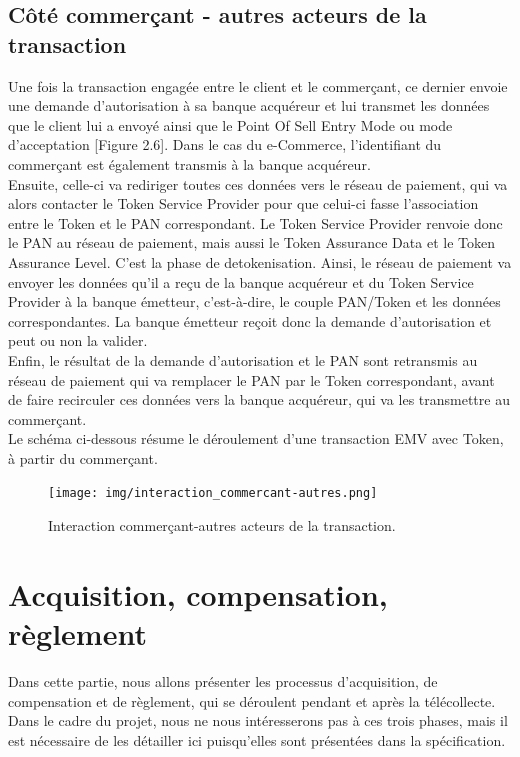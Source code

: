 \documentclass{report}
\begin{document}
\subsection{Côté commerçant - autres acteurs de la transaction}
Une fois la transaction engagée entre le client et le commerçant, ce dernier envoie une demande d'autorisation à sa banque acquéreur et lui transmet les données que le client lui a envoyé ainsi que le Point Of Sell Entry Mode ou mode d'acceptation [Figure 2.6]. Dans le cas du e-Commerce, l'identifiant du commerçant est également transmis à la banque acquéreur.\\
Ensuite, celle-ci va rediriger toutes ces données vers le réseau de paiement, qui va alors contacter le Token Service Provider pour que celui-ci fasse l'association entre le Token et le PAN correspondant. Le Token Service Provider renvoie donc le PAN au réseau de paiement, mais aussi le Token Assurance Data et le Token Assurance Level. C'est la phase de detokenisation. Ainsi, le réseau de paiement va envoyer les données qu'il a reçu de la banque acquéreur et du Token Service Provider à la banque émetteur, c'est-à-dire, le couple PAN/Token et les données correspondantes. La banque émetteur reçoit donc la demande d'autorisation et peut ou non la valider.\\
Enfin, le résultat de la demande d'autorisation et le PAN sont retransmis au réseau de paiement qui va remplacer le PAN par le Token correspondant, avant de faire recirculer ces données vers la banque acquéreur, qui va les transmettre au commerçant.\\

\noindent
Le schéma ci-dessous résume le déroulement d'une transaction EMV avec Token, à partir du commerçant.

\begin{figure}[!ht]
    \centering
			\texttt{[image: img/interaction\_commercant-autres.png]}
			\caption{\label{CommerçantAutresActeurs} Interaction commerçant-autres acteurs de la transaction.}			
\end{figure}


\section{Acquisition, compensation, règlement}
Dans cette partie, nous allons présenter les processus d'acquisition, de compensation et de règlement, qui se déroulent pendant et après la télécollecte.\\

\noindent
Dans le cadre du projet, nous ne nous intéresserons pas à ces trois phases, mais il est nécessaire de les détailler ici puisqu'elles sont présentées dans la spécification.
\end{document}

